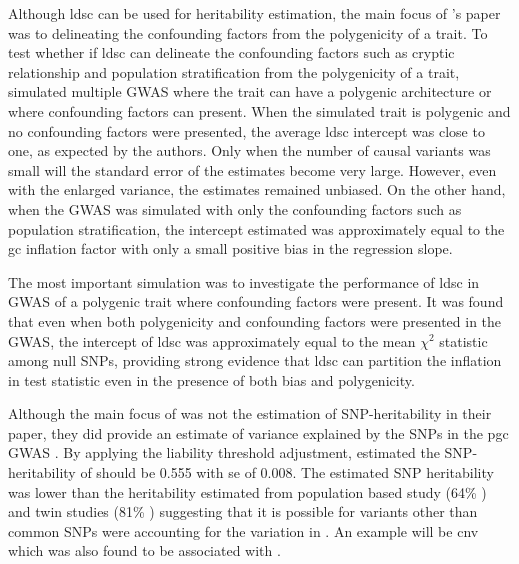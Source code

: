 	
	Although \gls{ldsc} can be used for heritability estimation, the main focus of \citet{Bulik-Sullivan2015}'s paper was to delineating the confounding factors from the 	polygenicity of a trait.
	To test whether if \gls{ldsc} can delineate the confounding factors such as cryptic relationship and population stratification from the polygenicity of a trait, \citet{Bulik-Sullivan2015} simulated multiple \gls{GWAS} where the trait can have a polygenic architecture or where confounding factors can present.
	When the simulated trait is polygenic and no confounding factors were presented, the average \gls{ldsc} intercept was close to one, as expected by the authors.
	Only when the number of causal variants was small will the standard error of the estimates become very large.
	However, even with the enlarged variance, the estimates remained unbiased.
	On the other hand, when the \gls{GWAS} was simulated with only the confounding factors such as population stratification, the intercept estimated was approximately equal to the \gls{gc} inflation factor with only a small positive bias in the regression slope.
	
	The most important simulation was to investigate the performance of \gls{ldsc} in \gls{GWAS} of a polygenic trait where confounding factors were present. 
	It was found that even when both polygenicity and confounding factors were presented in the \gls{GWAS}, the intercept of \gls{ldsc} was approximately equal to the mean $\chi^2$ statistic among null \glspl{SNP}, providing strong evidence that \gls{ldsc} can partition the inflation in test statistic even in the presence of both bias and polygenicity.
	
	Although the main focus of \citet{Bulik-Sullivan2015} was not the estimation of \gls{SNP}-heritability in their paper, they did provide an estimate of variance explained by the \glspl{SNP} in the \gls{pgc}  \gls{GWAS} \citep{Ripke2014}.
	By applying the liability threshold adjustment, \citet{Bulik-Sullivan2015} estimated the \gls{SNP}-heritability of  should be 0.555 with \gls{se} of 0.008.
	The estimated \gls{SNP} heritability was lower than the heritability estimated from population based study (64\% \citep{Lichtenstein2009}) and twin studies (81\% \citep{Sullivan2003}) suggesting that it is possible for variants other than common \glspl{SNP} were accounting for the variation in .
	An example will be \gls{cnv} which was also found to be associated with  \citep{Szatkiewicz2014}.
	
